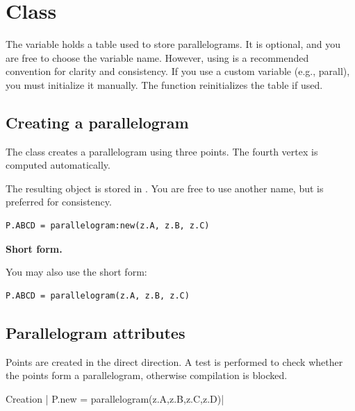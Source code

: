 \newpage
\section{Class }
The variable  holds a table used to store parallelograms. It is optional, and you are free to choose the variable name. However, using  is a recommended convention for clarity and consistency. If you use a custom variable (e.g., parall), you must initialize it manually. The  function reinitializes the  table if used.


\subsection{Creating a parallelogram}
\label{sub:creating_a_parallelogram}

The  class creates a parallelogram using three points. The fourth vertex is computed automatically.

\medskip
The resulting object is stored in . You are free to use another name, but  is preferred for consistency.

\begin{mybox}
\begin{verbatim}
P.ABCD = parallelogram:new(z.A, z.B, z.C)
\end{verbatim}
\end{mybox}

\textbf{Short form.}

You may also use the short form:

\begin{mybox}
\begin{verbatim}
P.ABCD = parallelogram(z.A, z.B, z.C)
\end{verbatim}
\end{mybox}

\subsection{Parallelogram attributes}

Points are created in the direct direction. A test is performed to check whether the points form a parallelogram, otherwise compilation is blocked.

\begin{mybox}
Creation | P.new = parallelogram(z.A,z.B,z.C,z.D)|
\end{mybox}


